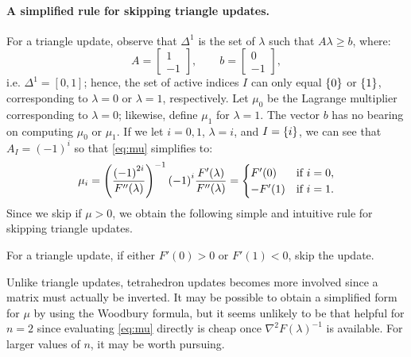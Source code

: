 \documentclass[eikonal.tex]{subfiles}
\begin{document}
\paragraph{A simplified rule for skipping triangle updates.} For a
triangle update, observe that $\Delta^1$ is the set of $\lambda$ such
that $A\lambda \geq b$, where:
\begin{equation}
  A = \begin{bmatrix} 1 \\ -1 \end{bmatrix}, \qquad b = \begin{bmatrix} 0 \\ -1 \end{bmatrix},
\end{equation}
i.e. $\Delta^1 = [0, 1]$; hence, the set of active indices $I$ can
only equal $\left\{0\right\}$ or $\left\{1\right\}$, corresponding to $\lambda = 0$ or
$\lambda = 1$, respectively. Let $\mu_0$ be the Lagrange multiplier
corresponding to $\lambda = 0$; likewise, define $\mu_1$ for
$\lambda = 1$. The vector $b$ has no bearing on computing $\mu_0$ or
$\mu_1$. If we let $i = 0, 1$, $\lambda = i$, and $I = \left\{i\right\}$, we
can see that $A_I = (-1)^i$ so that \cref{eq:mu} simplifies to:
\begin{equation}
  \mu_i = \left(\frac{{(-1)}^{2i}}{F''(\lambda)}\right)^{-1} {(-1)}^{i} \frac{F'(\lambda)}{F''(\lambda)} = \begin{cases}
    F'(0) & \mbox{if } i = 0, \\
    -F'(1) & \mbox{if } i = 1.
  \end{cases}
\end{equation}
Since we skip if $\mu > 0$, we obtain the following simple and
intuitive rule for skipping triangle updates.
\begin{mdframed}
  \begin{center}
    For a triangle update, if either $F'(0) > 0$ or $F'(1) < 0$, skip
    the update.
  \end{center}
\end{mdframed}
Unlike triangle updates, tetrahedron updates becomes more involved
since a matrix must actually be inverted. It may be possible to obtain
a simplified form for $\mu$ by using the Woodbury formula, but it
seems unlikely to be that helpful for $n = 2$ since evaluating
\cref{eq:mu} directly is cheap once $\nabla^2 F(\lambda)^{-1}$ is
available. For larger values of $n$, it may be worth pursuing.
\end{document}
